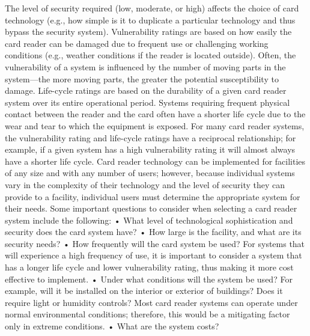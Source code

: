 \documentclass{article}
\begin{document}
The level of security required (low, moderate, or high) affects the
choice of card technology (e.g., how simple is it to duplicate a
particular technology and thus bypass the security system).
Vulnerability ratings are based on how easily the card reader can be
damaged due to frequent use or challenging working conditions (e.g.,
weather conditions if the reader is located outside). Often, the
vulnerability of a system is influenced by the number of moving parts in
the system---the more moving parts, the greater the potential
susceptibility to damage. Life-cycle ratings are based on the durability
of a given card reader system over its entire operational period.
Systems requiring frequent physical contact between the reader and the
card often have a shorter life cycle due to the wear and tear to which
the equipment is exposed. For many card reader systems, the
vulnerability rating and life-cycle ratings have a reciprocal
relationship; for example, if a given system has a high vulnerability
rating it will almost always have a shorter life cycle. Card reader
technology can be implemented for facilities of any size and with any
number of users; however, because individual systems vary in the
complexity of their technology and the level of security they can
provide to a facility, individual users must determine the appropriate
system for their needs. Some important questions to consider when
selecting a card reader system include the following: • What level of
technological sophistication and security does the card system have? •
How large is the facility, and what are its security needs? • How
frequently will the card system be used? For systems that will
experience a high frequency of use, it is important to consider a system
that has a longer life cycle and lower vulnerability rating, thus making
it more cost effective to implement. • Under what conditions will the
system be used? For example, will it be installed on the interior or
exterior of buildings? Does it require light or humidity controls? Most
card reader systems can operate under normal environmental conditions;
therefore, this would be a mitigating factor only in extreme conditions.
• What are the system costs?
\end{document}
